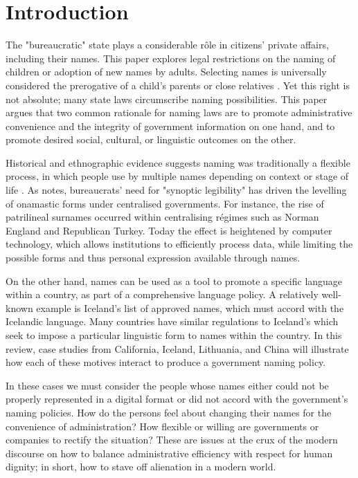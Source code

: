 \section{Introduction}

The "bureaucratic" state plays a considerable rôle in citizens' private affairs,
including their names. This paper explores legal restrictions on the naming of
children or adoption of new names by adults. Selecting names is universally
considered the prerogative of a child's parents or close relatives
\parencite{alford88}. Yet this right is not absolute; many state laws
circumscribe naming possibilities. This paper argues that two common rationale
for naming laws are to promote administrative convenience and the integrity of
government information on one hand, and to promote desired social, cultural, or
linguistic outcomes on the other.

Historical and ethnographic evidence suggests naming was traditionally a
flexible process, in which people use by multiple names depending on context or
stage of life \parencite{alford88} \parencite{scott02}. As \textcite{scott02}
notes, bureaucrats' need for "synoptic legibility" has driven the levelling of
onamastic forms under centralised governments. For instance, the rise of
patrilineal surnames occurred within centralising régimes such as Norman England
and Republican Turkey. Today the effect is heightened by computer technology,
which allows institutions to efficiently process data, while limiting the
possible forms and thus personal expression available through names.

On the other hand, names can be used as a tool to promote a specific language
within a country, as part of a comprehensive language policy. A relatively
well-known example is Iceland's list of approved names, which must accord with
the Icelandic language. Many countries have similar regulations to Iceland's
which seek to impose a particular linguistic form to names within the country.
In this review, case studies from California, Iceland, Lithuania, and China will
illustrate how each of these motives interact to produce a government naming
policy.

In these cases we must consider the people whose names either could not be
properly represented in a digital format or did not accord with the government's
naming policies. How do the persons feel about changing their names for the
convenience of administration? How flexible or willing are governments or
companies to rectify the situation? These are issues at the crux of the modern
discourse on how to balance administrative efficiency with respect for human
dignity; in short, how to stave off alienation in a modern world.

